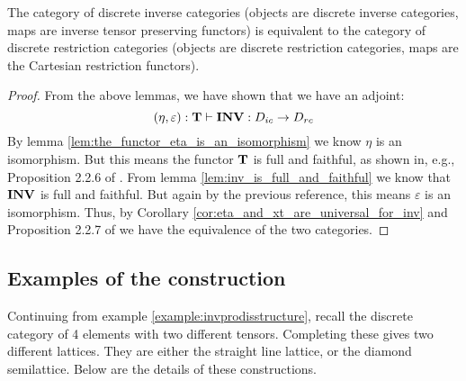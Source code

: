 \begin{theorem}\label{thm:discrete_inverse_categories_are_equivalent_to_discrete_restriction_categories}
  The category of discrete inverse categories (objects are discrete inverse categories, maps are
  inverse tensor preserving functors) is equivalent to the category of discrete restriction
  categories (objects are discrete restriction categories, maps are the Cartesian restriction
  functors).
\end{theorem}
\begin{proof}
  From the above lemmas, we have shown that we have an adjoint:
  \begin{equation}
    (\eta,\varepsilon):\mathbf{T} \vdash \mathbf{INV} :D_{ic} \to D_{rc} \label{eq:inv_and_wtf_are_adjoint_pair}
  \end{equation}
  By lemma \vref{lem:the_functor_eta_is_an_isomorphism} we know $\eta$ is an isomorphism. But this
  means the functor $\mathbf{T}$ is full and faithful, as shown in, e.g., Proposition 2.2.6 of
  \cite{cockett2009:ctcs}. From lemma \ref{lem:inv_is_full_and_faithful} we know that $\mathbf{INV}$ is
  full and faithful. But again by the previous reference, this means $\varepsilon$ is an
  isomorphism. Thus, by Corollary \ref{cor:eta_and_xt_are_universal_for_inv} and Proposition 2.2.7
  of \cite{cockett2009:ctcs} we have the equivalence of the two categories.
\end{proof}
\subsection{Examples of the \texorpdfstring{\wtc}{tilde} construction} %
\label{sub:examples_of_the_wtf_construction}

\begin{example}
  \label{example:completing_a_finite_discrete_inverse_category}
\end{example}
Continuing from example \vref{example:invprodisstructure}, recall the discrete category of 4
elements with two different tensors. Completing these gives two different lattices. They are either
the straight line lattice, or the diamond semilattice. Below are the details of these constructions.

